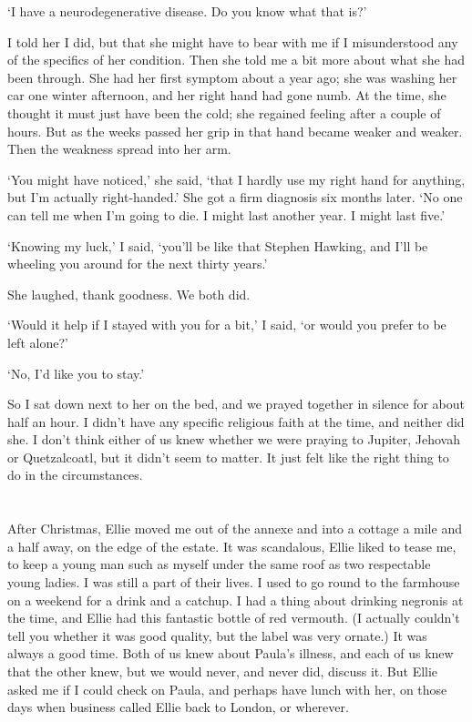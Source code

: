 `I have a neurodegenerative disease. Do you know what that is?'

I told her I did, but that she might have to bear with me if I misunderstood any of the specifics of her condition. Then she told me a bit more about what she had been through. She had her first symptom about a year ago; she was washing her car one winter afternoon, and her right hand had gone numb. At the time, she thought it must just have been the cold; she regained feeling after a couple of hours. But as the weeks passed her grip in that hand became weaker and weaker. Then the weakness spread into her arm.

`You might have noticed,' she said, `that I hardly use my right hand for anything, but I'm actually right-handed.' She got a firm diagnosis six months later. `No one can tell me when I'm going to die. I might last another year. I might last five.'

`Knowing my luck,' I said, `you'll be like that Stephen Hawking, and I'll be wheeling you around for the next thirty years.'

She laughed, thank goodness. We both did.

`Would it help if I stayed with you for a bit,' I said, `or would you prefer to be left alone?'

`No, I'd like you to stay.'

So I sat down next to her on the bed, and we prayed together in silence for about half an hour. I didn't have any specific religious faith at the time, and neither did she. I don't think either of us knew whether we were praying to Jupiter, Jehovah or Quetzalcoatl, but it didn't seem to matter. It just felt like the right thing to do in the circumstances.

\section{}

After Christmas, Ellie moved me out of the annexe and into a cottage a mile and a half away, on the edge of the estate. It was scandalous, Ellie liked to tease me, to keep a young man such as myself under the same roof as two respectable young ladies. I was still a part of their lives. I used to go round to the farmhouse on a weekend for a drink and a catchup. I had a thing about drinking negronis at the time, and Ellie had this fantastic bottle of red vermouth. (I actually couldn't tell you whether it was good quality, but the label was very ornate.) It was always a good time. Both of us knew about Paula's illness, and each of us knew that the other knew, but we would never, and never did, discuss it. But Ellie asked me if I could check on Paula, and perhaps have lunch with her, on those days when business called Ellie back to London, or wherever.

